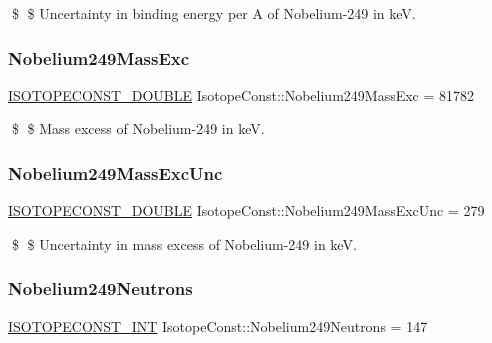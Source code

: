 \$ \$ Uncertainty in binding energy per A of Nobelium-\/249 in keV. \mbox{\label{group___isotope_const-_nobelium-_no249_ga7205381e2a024197937b3f4cdc184032}} 
\subsubsection{\texorpdfstring{Nobelium249\+Mass\+Exc}{Nobelium249MassExc}}
{\footnotesize\ttfamily \mbox{\hyperlink{group___isotope_const-_macros_ga8f45a7272ce02c0b4c65c44636ed719a}{I\+S\+O\+T\+O\+P\+E\+C\+O\+N\+S\+T\+\_\+\+D\+O\+U\+B\+LE}} Isotope\+Const\+::\+Nobelium249\+Mass\+Exc = 81782}

\$ \$ Mass excess of Nobelium-\/249 in keV. \mbox{\label{group___isotope_const-_nobelium-_no249_gadda7833e7fc95f3b3a88d9b1829ee63f}} 
\subsubsection{\texorpdfstring{Nobelium249\+Mass\+Exc\+Unc}{Nobelium249MassExcUnc}}
{\footnotesize\ttfamily \mbox{\hyperlink{group___isotope_const-_macros_ga8f45a7272ce02c0b4c65c44636ed719a}{I\+S\+O\+T\+O\+P\+E\+C\+O\+N\+S\+T\+\_\+\+D\+O\+U\+B\+LE}} Isotope\+Const\+::\+Nobelium249\+Mass\+Exc\+Unc = 279}

\$ \$ Uncertainty in mass excess of Nobelium-\/249 in keV. \mbox{\label{group___isotope_const-_nobelium-_no249_gab2d030a382c7ef1183c1516e6aec50c5}} 
\subsubsection{\texorpdfstring{Nobelium249\+Neutrons}{Nobelium249Neutrons}}
{\footnotesize\ttfamily \mbox{\hyperlink{group___isotope_const-_macros_ga5f18360b3e99483a35c32d789e62621c}{I\+S\+O\+T\+O\+P\+E\+C\+O\+N\+S\+T\+\_\+\+I\+NT}} Isotope\+Const\+::\+Nobelium249\+Neutrons = 147}

